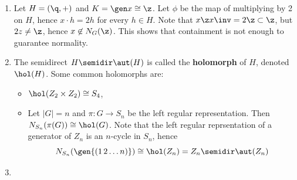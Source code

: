 \begin{ex}
\begin{enumerate}
        Suppose $n > 2$. We show that $\bar G$ has a unique subgroup of order 2, namely $\gen{\bar x^2}$. Let $\bar h^i \bar x^j$ be an element in $\bar G$. We split into three cases:
        \begin{itemize}
            \item If $j = 0$, then $\bar h^i$ has order 2 if and only if $\bar h^i = \bar h^{2^{n - 1}} = \bar x^2$.
            \item If $j = 2$, then $(\bar h^i\bar x^2)^2 = \bar h^{2i}$ has order 2 if and only if $\bar h^{2i} = \bar h^{2^{n - 1}} = \bar x^2$, hence $\bar h^i\bar x^2$ has order 4.
            \item If $j = 1$ or $3$, then $\bar x^j$ inverts $\bar h$, so $(\bar h^i \bar x^j)^2 = \bar h^i \bar x^j \bar h^i \bar x^j = \bar h^i (\bar x^j \bar h^i \bar x^{-j}) \bar x^{2j} = \bar h^i \bar h^{-i}\bar x^{2j} = \bar x^2$, so $\bar h^i \bar x^j$ has order 4.
        \end{itemize}

        We claim that $Z(\bar G) = \gen{\bar x^2}$. To see that $\bar x^2 \in Z(\bar G)$, recall that $\bar x^2 = \bar h^{2^{n - 1}}$. This commutes with $\bar h$ trivially, while $\bar x^2$ clearly commutes with $\bar x$. We call $\bar G$ the \textbf{generalized quaternion group} of order $2^{n + 1}$, which is denoted by $Q_{2^{n + 1}}$ with the presentation:
        \[Q_{2^{n + 1}} = \gen{h, x \mid h^{2^n} = x^4 = 1, x\inv hx = h\inv, h^{2^{n - 1}} = x^2}\]
            \item Let $H = (\q, +)$ and $K = \gen x \cong \z$. Let $\phi$ be the map of multiplying by 2 on $H$, hence $x \cdot h = 2h$ for every $h \in H$. Note that $x \z x\inv = 2\z \subset \z$, but $2z \neq \z$, hence $x \not\in N_G(\z)$. This shows that containment is not enough to guarantee normality. 
        \item The semidirect $H \semidir \aut(H)$ is called the \textbf{holomorph} of $H$, denoted $\hol(H)$. Some common holomorphs are:
        \begin{itemize}
            \item $\hol(Z_2 \times Z_2) \cong S_4$,
            \item Let $|G| = n$ and $\pi : G \to S_n$ be the left regular representation. Then $N_{S_n}(\pi(G)) \cong \hol(G)$. Note that the left regular reprsentation of a generator of $Z_n$ is an $n$-cycle in $S_n$, hence
            \[N_{S_n}(\gen{(1\, 2 \ldots n)}) \cong \hol(Z_n) = Z_n \semidir \aut(Z_n)\]
        \end{itemize}
        \item 
    \end{enumerate}
\end{ex}